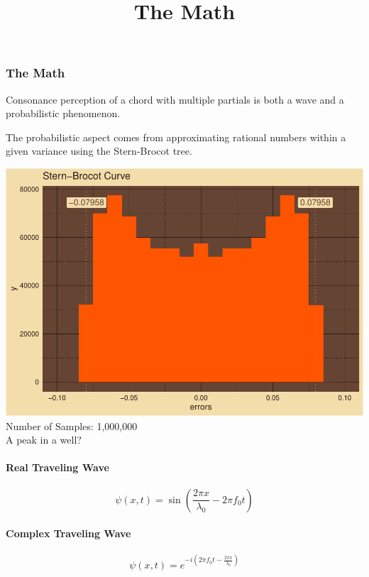 \documentclass[
]{article}
\title{The Math}
\author{}
\date{\vspace{-2.5em}}
\begin{document}
\maketitle

\subsubsection{The Math}\label{the-math}

Consonance perception of a chord with multiple partials is both a wave
and a probabilistic phenomenon.

The probabilistic aspect comes from approximating rational numbers
within a given variance using the Stern-Brocot tree.

\includegraphics{man/figures/SternBrocotCurve-unnamed-chunk-5-1.pdf}\\
Number of Samples: 1,000,000\\
A peak in a well?\\

\paragraph{Real Traveling Wave}\label{real-traveling-wave}

\[\psi(x,t) = \sin \left( \frac{2\pi x}{\lambda_{0}} - 2 \pi f_{0} t \right)\]

\paragraph{Complex Traveling Wave}\label{complex-traveling-wave}

\[\psi(x,t) = e ^ {-i\left( 2 \pi f_{0} t - \frac{2\pi x}{\lambda_{0}} \right)}\]
\end{document}
